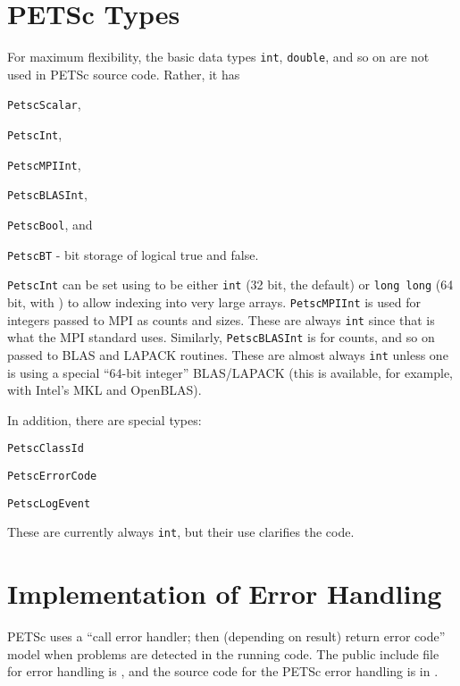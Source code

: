 \section{PETSc Types}
For maximum flexibility, the basic data types \lstinline{int}, \lstinline{double}, and so on are
 not used in PETSc source code. Rather, it has
\begin{tightitemize}
  \item \lstinline{PetscScalar},
  \item \lstinline{PetscInt},
  \item \lstinline{PetscMPIInt},
  \item \lstinline{PetscBLASInt},
  \item \lstinline{PetscBool}, and
  \item \lstinline{PetscBT} - bit storage of logical true and false.
\end{tightitemize}
\lstinline{PetscInt} can be set using  to be either \lstinline{int} (32 bit, the default) or \lstinline{long long}
(64 bit, with ) to allow indexing into very large arrays.
\lstinline{PetscMPIInt} is used for integers passed to MPI as counts and sizes.
These are always \lstinline{int} since that is what the MPI standard uses.
Similarly, \lstinline{PetscBLASInt} is for counts, and so on passed to BLAS and LAPACK routines.
These are almost always \lstinline{int} unless one is using a special ``64-bit integer'' BLAS/LAPACK (this is available, for
example,  with Intel's MKL and OpenBLAS).

In addition, there are special types:
\begin{tightitemize}
  \item \lstinline{PetscClassId}
  \item \lstinline{PetscErrorCode}
  \item \lstinline{PetscLogEvent}
\end{tightitemize}
These are currently always \lstinline{int}, but their use clarifies the code.

\section{Implementation of Error Handling}

PETSc  uses a ``call error handler; then (depending on result) return
error code'' model when problems are detected in the running code.
The public include file for error handling is
 \href{https://www.mcs.anl.gov/petsc/petsc-master/include/petscerror.h.html}{},
 and the source code for the PETSc error handling is in .

